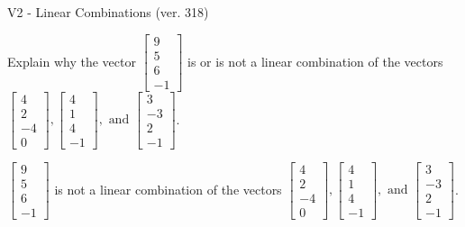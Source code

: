 \begin{exercise}
  \begin{exerciseTitle}V2 - Linear Combinations (ver. 318)\end{exerciseTitle}
  \begin{exerciseStatement}
    Explain why the vector \(\left[\begin{array}{c}
9 \\
5 \\
6 \\
-1
\end{array}\right]\)  is or is not a linear 
	combination of the vectors \(\left[\begin{array}{c}
4 \\
2 \\
-4 \\
0
\end{array}\right] , \left[\begin{array}{c}
4 \\
1 \\
4 \\
-1
\end{array}\right] , \text{ and } \left[\begin{array}{c}
3 \\
-3 \\
2 \\
-1
\end{array}\right]\).
	


  \end{exerciseStatement}
  \begin{exerciseAnswer}
   \(\left[\begin{array}{c}
9 \\
5 \\
6 \\
-1
\end{array}\right]\) 
  	 is not  
	a linear combination of the vectors \(\left[\begin{array}{c}
4 \\
2 \\
-4 \\
0
\end{array}\right] , \left[\begin{array}{c}
4 \\
1 \\
4 \\
-1
\end{array}\right] , \text{ and } \left[\begin{array}{c}
3 \\
-3 \\
2 \\
-1
\end{array}\right]\).

	
  


  \end{exerciseAnswer}
\end{exercise}